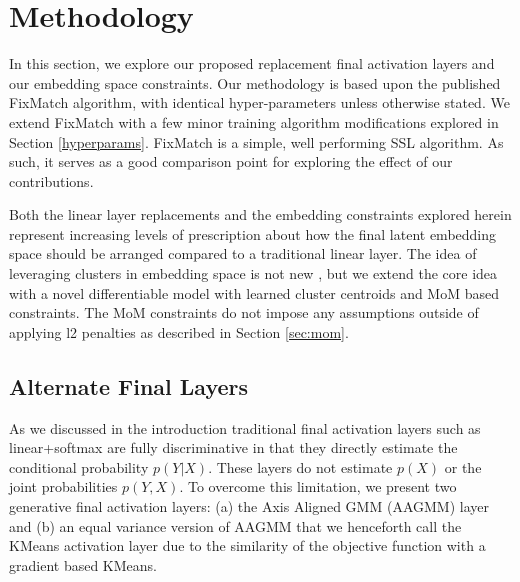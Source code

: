 \documentclass[10pt,twocolumn,letterpaper]{article}
\begin{document}




\section{Methodology}

In this section, we explore our proposed replacement final activation layers and our embedding space constraints.
Our methodology is based upon the published FixMatch \cite{sohn2020fixmatch} algorithm, with identical hyper-parameters unless otherwise stated.
We extend FixMatch with a few minor training algorithm modifications explored in Section \ref{hyperparams}.
FixMatch \cite{sohn2020fixmatch} is a simple, well performing SSL algorithm.
As such, it serves as a good comparison point for exploring the effect of our contributions.

Both the linear layer replacements and the embedding constraints explored herein represent increasing levels of prescription about how the final latent embedding space should be arranged compared to a traditional linear layer.
The idea of leveraging clusters in embedding space is not new \cite{caron2018deep,caron2020unsupervised,enguehard2019semi}, but we extend the core idea with a novel differentiable model with learned cluster centroids and MoM based constraints.
The MoM constraints do not impose any assumptions outside of applying l2 penalties as described in Section \ref{sec:mom}.

\subsection{Alternate Final Layers}

As we discussed in the introduction traditional final activation layers such as linear+softmax are fully discriminative in that they directly estimate the conditional probability $p(Y|X)$. 
These layers do not estimate $p(X)$ or the joint probabilities $p(Y,X)$.
To overcome this limitation, we present two generative final activation layers: (a) the Axis Aligned GMM (AAGMM) layer and (b) an equal variance version of AAGMM that we henceforth call the KMeans activation layer due to the similarity of the objective function with a gradient based KMeans.
\end{document}
